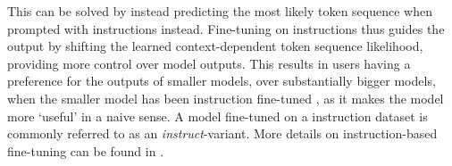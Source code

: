 This can be solved by instead predicting the most likely token sequence when prompted with instructions instead.
Fine-tuning on instructions thus guides the output by shifting the learned context-dependent token sequence likelihood, providing more control over model outputs.
This results in users having a preference for the outputs of smaller models, over substantially bigger models, when the smaller model has been instruction fine-tuned \cite{ouyang_training_2022}, as it makes the model more `useful' in a naive sense.
A model fine-tuned on  a instruction dataset is commonly referred to as an \textit{instruct}-variant.
More details on instruction-based fine-tuning can be found in \cite{ouyang_training_2022, tirumala_d4_2023}.


